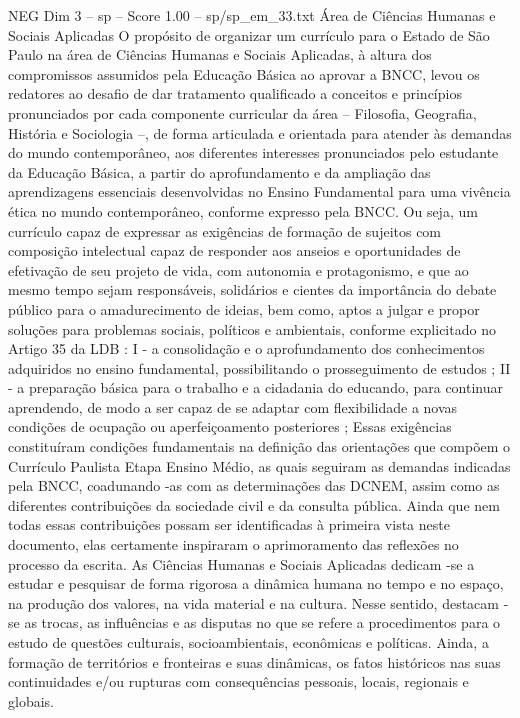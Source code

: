 \begin{textsample}{NEG Dim 3 – sp – Score 1.00 – sp/sp\_em\_33.txt}  \label{ex:f3_neg_088}
Área de Ciências Humanas e Sociais Aplicadas O propósito de organizar um currículo para o Estado de São Paulo na área de Ciências Humanas e Sociais Aplicadas, à altura dos compromissos assumidos pela Educação Básica ao aprovar a BNCC, levou os redatores ao desafio de dar tratamento qualificado a conceitos e princípios pronunciados por cada componente curricular da área – Filosofia, Geografia, História e Sociologia –, de forma articulada e orientada para atender às demandas do mundo contemporâneo, aos diferentes interesses pronunciados pelo estudante da Educação Básica, a partir do aprofundamento e da ampliação das aprendizagens essenciais desenvolvidas no Ensino Fundamental para uma vivência ética no mundo contemporâneo, conforme expresso pela BNCC.
Ou seja, um currículo capaz de expressar as exigências de formação de sujeitos com composição intelectual capaz de responder aos anseios e oportunidades de efetivação de seu projeto de vida, com autonomia e protagonismo, e que ao mesmo tempo sejam responsáveis, solidários e cientes da importância do debate público para o amadurecimento de ideias, bem como, aptos a julgar e propor soluções para problemas sociais, políticos e ambientais, conforme explicitado no Artigo 35 da LDB : I - a consolidação e o aprofundamento dos conhecimentos adquiridos no ensino fundamental, possibilitando o prosseguimento de estudos ; II - a preparação básica para o trabalho e a cidadania do educando, para continuar aprendendo, de modo a ser capaz de se adaptar com flexibilidade a novas condições de ocupação ou aperfeiçoamento posteriores ; Essas exigências constituíram condições fundamentais na definição das orientações que compõem o Currículo Paulista Etapa Ensino Médio, as quais seguiram as demandas indicadas pela BNCC, coadunando -as com as determinações das DCNEM, assim como as diferentes contribuições da sociedade civil e da consulta pública.
Ainda que nem todas essas contribuições possam ser identificadas à primeira vista neste documento, elas certamente inspiraram o aprimoramento das reflexões no processo da escrita.
As Ciências Humanas e Sociais Aplicadas dedicam -se a estudar e pesquisar de forma rigorosa a dinâmica humana no tempo e no espaço, na produção dos valores, na vida material e na cultura.
Nesse sentido, destacam -se as trocas, as influências e as disputas no que se refere a procedimentos para o estudo de questões culturais, socioambientais, econômicas e políticas.
Ainda, a formação de territórios e fronteiras e suas dinâmicas, os fatos históricos nas suas continuidades e/ou rupturas com consequências pessoais, locais, regionais e globais.

\end{textsample}
